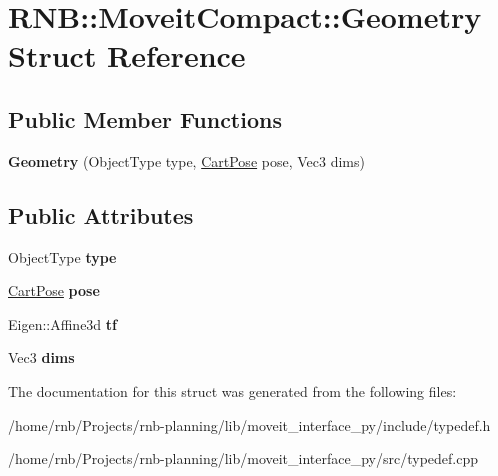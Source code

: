 \hypertarget{struct_r_n_b_1_1_moveit_compact_1_1_geometry}{}\section{R\+NB\+:\+:Moveit\+Compact\+:\+:Geometry Struct Reference}
\label{struct_r_n_b_1_1_moveit_compact_1_1_geometry}
\subsection*{Public Member Functions}
\begin{DoxyCompactItemize}
\item 
\mbox{\label{struct_r_n_b_1_1_moveit_compact_1_1_geometry_a07abe1e7f997e8912e3613e2b79e7068}} 
{\bfseries Geometry} (Object\+Type type, \hyperlink{class_r_n_b_1_1_moveit_compact_1_1_cart_pose}{Cart\+Pose} pose, Vec3 dims)
\end{DoxyCompactItemize}
\subsection*{Public Attributes}
\begin{DoxyCompactItemize}
\item 
\mbox{\label{struct_r_n_b_1_1_moveit_compact_1_1_geometry_a5ee020f2993ae6acf09e0541f18ad7e0}} 
Object\+Type {\bfseries type}
\item 
\mbox{\label{struct_r_n_b_1_1_moveit_compact_1_1_geometry_ad99395fb436817cb0b5d9a38239937be}} 
\hyperlink{class_r_n_b_1_1_moveit_compact_1_1_cart_pose}{Cart\+Pose} {\bfseries pose}
\item 
\mbox{\label{struct_r_n_b_1_1_moveit_compact_1_1_geometry_a35f7947bd2a158e7741f6f03962fddc2}} 
Eigen\+::\+Affine3d {\bfseries tf}
\item 
\mbox{\label{struct_r_n_b_1_1_moveit_compact_1_1_geometry_a0d6dc8756e3a2597eb7d2d4c25e74cc7}} 
Vec3 {\bfseries dims}
\end{DoxyCompactItemize}


The documentation for this struct was generated from the following files\+:\begin{DoxyCompactItemize}
\item 
/home/rnb/\+Projects/rnb-\/planning/lib/moveit\+\_\+interface\+\_\+py/include/typedef.\+h\item 
/home/rnb/\+Projects/rnb-\/planning/lib/moveit\+\_\+interface\+\_\+py/src/typedef.\+cpp\end{DoxyCompactItemize}
